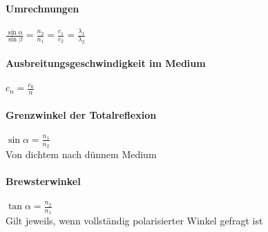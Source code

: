 \documentclass[12pt, a4paper]{scrreprt}
\begin{document}
\paragraph{Umrechnungen} \dotfill \(\frac{\sin \alpha}{\sin \beta} = \frac{n_2}{n_1} = \frac{c_1}{c_2} = \frac{\lambda_1}{\lambda_2}\)\\
\myhspace{} 
\paragraph{Ausbreitungsgeschwindigkeit im Medium} \dotfill \(c_n = \frac{c_0}{n}\)
\paragraph{Grenzwinkel der Totalreflexion} \dotfill \(\sin \alpha = \frac{n_1}{n_2}\)\\
\myhspace{} Von dichtem nach dünnem Medium
\paragraph{Brewsterwinkel} \dotfill \(\tan \alpha = \frac{n_2}{n_1}\)\\
\myhspace{} Gilt jeweils, wenn vollständig polarisierter Winkel gefragt ist\\
\myhspace{} \\
\myhspace{} 
\end{document}
